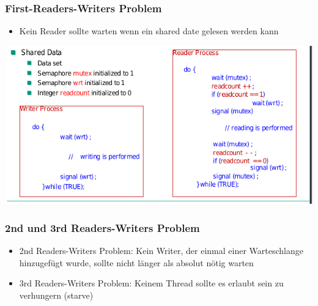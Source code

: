 \documentclass[a4paper]{scrreprt}
\begin{document}
			\subsubsection{First-Readers-Writers Problem}
				\begin{itemize}
					\item Kein Reader sollte warten wenn ein shared date gelesen werden kann
				\end{itemize}	
			\includegraphics[scale=0.6]{graphics/readerwriterprob.png}
			
			\subsubsection{2nd und 3rd Readers-Writers Problem}
				\begin{itemize}
					\item 2nd Readers-Writers Problem: Kein Writer, der einmal einer Warteschlange hinzugefügt wurde, sollte nicht länger als absolut nötig warten
					\item 3rd Readers-Writers Problem: Keinem Thread sollte es erlaubt sein zu verhungern (starve)
				\end{itemize}
\end{document}
